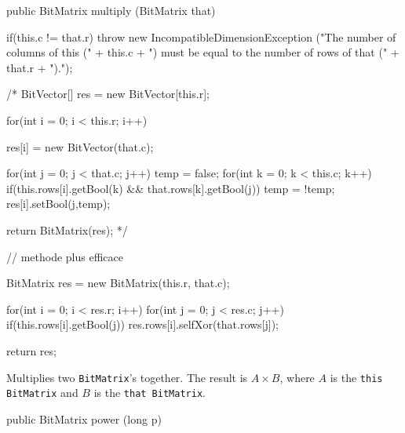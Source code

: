 \begin{code}

   public BitMatrix multiply (BitMatrix that) \begin{hide} {
      if(this.c != that.r)
         throw new IncompatibleDimensionException
         ("The number of columns of this (" + this.c +
          ") must be equal to the number of rows of that (" +
          that.r + ").");

      /*
      BitVector[] res = new BitVector[this.r];

      for(int i = 0; i < this.r; i++) {
         res[i] = new BitVector(that.c);

         for(int j = 0; j < that.c; j++) {
            temp = false;
            for(int k = 0; k < this.c; k++)
               if(this.rows[i].getBool(k) &&
                     that.rows[k].getBool(j))
                  temp = !temp;
            res[i].setBool(j,temp);
         }
      }

      return BitMatrix(res);
      */

      // methode plus efficace

      BitMatrix res = new BitMatrix(this.r, that.c);

      for(int i = 0; i < res.r; i++)
          for(int j = 0; j < res.c; j++)
              if(this.rows[i].getBool(j))
                  res.rows[i].selfXor(that.rows[j]);

      return res;
   } \end{hide}
\end{code}
\begin{tabb} Multiplies two \texttt{BitMatrix}'s together. The result is
  $A \times B$, where $A$ is the \texttt{this BitMatrix} and $B$ is the
  \texttt{that BitMatrix}.
\end{tabb}
\begin{htmlonly}
\end{htmlonly}
\begin{code}

   public BitMatrix power (long p) 
\end{code}
